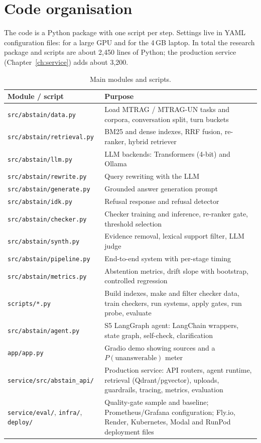 \documentclass[11pt,a4paper]{report}
\begin{document}
\section{Code organisation}
The code is a Python package with one script per step. Settings live in YAML configuration files:  for a large GPU and  for the 4\,GB laptop. In total the research package and scripts are about 2{,}450 lines of Python; the production service (Chapter~\ref{ch:service}) adds about 3{,}200.
\begin{table}[H]
\centering\small
\begin{tabularx}{\textwidth}{@{}lY@{}}
\toprule
Module / script & Purpose \\
\midrule
\texttt{src/abstain/data.py} & Load MTRAG / MTRAG-UN tasks and corpora, conversation split, turn buckets \\
\texttt{src/abstain/retrieval.py} & BM25 and dense indexes, RRF fusion, re-ranker, hybrid retriever \\
\texttt{src/abstain/llm.py} & LLM backends: Transformers (4-bit) and Ollama \\
\texttt{src/abstain/rewrite.py} & Query rewriting with the LLM \\
\texttt{src/abstain/generate.py} & Grounded answer generation prompt \\
\texttt{src/abstain/idk.py} & Refusal response and refusal detector \\
\texttt{src/abstain/checker.py} & Checker training and inference, re-ranker gate, threshold selection \\
\texttt{src/abstain/synth.py} & Evidence removal, lexical support filter, LLM judge \\
\texttt{src/abstain/pipeline.py} & End-to-end system with per-stage timing \\
\texttt{src/abstain/metrics.py} & Abstention metrics, drift slope with bootstrap, controlled regression \\
\texttt{scripts/*.py} & Build indexes, make and filter checker data, train checkers, run systems, apply gates, run probe, evaluate \\
\texttt{src/abstain/agent.py} & S5 LangGraph agent: LangChain wrappers, state graph, self-check, clarification \\
\texttt{app/app.py} & Gradio demo showing sources and a $P(\text{unanswerable})$ meter \\
\texttt{service/src/abstain\_api/} & Production service: API routers, agent runtime, retrieval (Qdrant/pgvector), uploads, guardrails, tracing, metrics, evaluation \\
\texttt{service/eval/}, \texttt{infra/}, \texttt{deploy/} & Quality-gate sample and baseline; Prometheus/Grafana configuration; Fly.io, Render, Kubernetes, Modal and RunPod deployment files \\
\bottomrule
\end{tabularx}
\caption{Main modules and scripts.}
\end{table}
\end{document}

